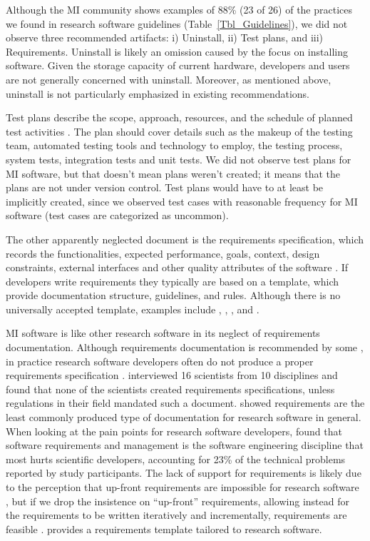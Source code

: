 \documentclass[11pt]{article}
\begin{document}
Although the MI community shows examples of 88\% (23 of 26) of the practices we
found in research software guidelines (Table~\ref{Tbl_Guidelines}), we did not
observe three recommended artifacts: i) Uninstall, ii) Test plans, and iii)
Requirements.  Uninstall is likely an omission caused by the focus on installing
software. Given the storage capacity of current hardware, developers and users
are not generally concerned with uninstall.  Moreover, as mentioned above,
uninstall is not particularly emphasized in existing recommendations.  

Test plans describe the scope, approach, resources, and the schedule of planned
test activities \citep{VanVliet2000}.  The plan should cover details such as the
makeup of the testing team, automated testing tools and technology to employ,
the testing process, system tests, integration tests and unit tests. We did not
observe test plans for MI software, but that doesn't mean plans weren't created;
it means that the plans are not under version control. Test plans would have to
at least be implicitly created, since we observed test cases with reasonable
frequency for MI software (test cases are categorized as uncommon).

The other apparently neglected document is the requirements specification, which
records the functionalities, expected performance, goals, context, design
constraints, external interfaces and other quality attributes of the software
\citep{IEEE1998}.  If developers write requirements they typically are based on
a template, which provide documentation structure, guidelines, and rules.
Although there is no universally accepted template, examples include
\citet{ESA1991}, \citet{IEEE1998}, \citet{NASA1989}, and
\citet{RobertsonAndRobertson1999Vol}.

MI software is like other research software in its neglect of requirements
documentation.  Although requirements documentation is recommended by some
\citep{TobiasEtAl2018, HerouxEtAl2008, SmithAndKoothoor2016}, in practice
research software developers often do not produce a proper requirements
specification \citep{HeatonAndCarver2015}. \citet{SandersAndKelly2008}
interviewed 16 scientists from 10 disciplines and found that none of the
scientists created requirements specifications, unless regulations in their
field mandated such a document. \citet{Nguyen-HoanEtAl2010} showed requirements
are the least commonly produced type of documentation for research software in
general. When looking at the pain points for research software developers,
\citet{WieseEtAl2019} found that software requirements and management is the
software engineering discipline that most hurts scientific developers,
accounting for 23\% of the technical problems reported by study participants.
The lack of support for requirements is likely due to the perception that
up-front requirements are impossible for research software
\citep{CarverEtAl2007, SegalAndMorris2008}, but if we drop the insistence on
``up-front'' requirements, allowing instead for the requirements to be written
iteratively and incrementally, requirements are feasible \citep{Smith2016}.
\citet{SmithEtAl2007} provides a requirements template tailored to research
software. 
\end{document}
